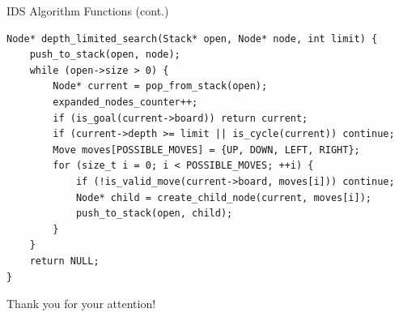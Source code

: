 \documentclass{oxblue-beamer}
\begin{document}
\begin{frame}[fragile]{IDS Algorithm Functions (cont.)}
\begin{verbatim}
Node* depth_limited_search(Stack* open, Node* node, int limit) {
    push_to_stack(open, node);
    while (open->size > 0) {
        Node* current = pop_from_stack(open);
        expanded_nodes_counter++;
        if (is_goal(current->board)) return current;
        if (current->depth >= limit || is_cycle(current)) continue;
        Move moves[POSSIBLE_MOVES] = {UP, DOWN, LEFT, RIGHT};
        for (size_t i = 0; i < POSSIBLE_MOVES; ++i) {
            if (!is_valid_move(current->board, moves[i])) continue;
            Node* child = create_child_node(current, moves[i]);
            push_to_stack(open, child);
        }
    }
    return NULL;
}
\end{verbatim}
\end{frame}

\begin{frame}
\centering \Large
Thank you for your attention!
\end{frame}
\end{document}
